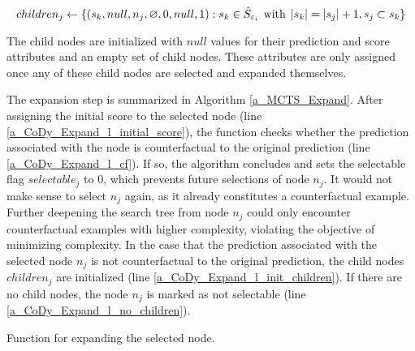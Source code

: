 \begin{equation}
    children_j \gets \{(s_k, null, n_j, \varnothing, 0, null, 1): s_k \in \hat{S}_{\varepsilon_i} \hspace{1.5mm} \mathrm{with} \hspace{1.5mm} |s_k| = |s_j| + 1, s_j \subset s_k\}
\end{equation}

The child nodes are initialized with $null$ values for their prediction and score attributes and an empty set of child nodes. These attributes are only assigned once any of these child nodes are selected and expanded themselves.

The expansion step is summarized in Algorithm \ref{a_MCTS_Expand}. After assigning the initial score to the selected node (line \ref{a_CoDy_Expand_l_initial_score}), the function checks whether the prediction associated with the node is counterfactual to the original prediction (line \ref{a_CoDy_Expand_l_cf}). If so, the algorithm concludes and sets the selectable flag $selectable_j$ to $0$, which prevents future selections of node $n_j$. It would not make sense to select $n_j$ again, as it already constitutes a counterfactual example. Further deepening the search tree from node $n_j$ could only encounter counterfactual examples with higher complexity, violating the objective of minimizing complexity. In the case that the prediction associated with the selected node $n_j$ is not counterfactual to the original prediction, the child nodes $children_j$ are initialized (line \ref{a_CoDy_Expand_l_init_children}). If there are no child nodes, the node $n_j$ is marked as not selectable (line \ref{a_CoDy_Expand_l_no_children}).

{
\setlength{\algomargin}{1.25em}
\begin{algorithm}[ht]
\caption{Function for expanding the selected node.}
\small
\label{a_MCTS_Expand}
\end{algorithm}
}

